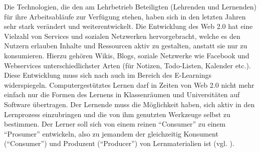 Die Technologien, die den am Lehrbetrieb Beteiligten (Lehrenden und Lernenden) für ihre Arbeitsabläufe zur Verfügung stehen, haben sich in den letzten Jahren sehr stark verändert und weiterentwickelt. Die Entwicklung des Web 2.0 hat eine Vielzahl von Services und sozialen Netzwerken hervorgebracht, welche es den Nutzern erlauben Inhalte und Ressourcen aktiv zu gestalten, anstatt sie nur zu konsumieren. Hierzu gehören Wikis, Blogs, soziale Netzwerke wie Facebook und Webservices unterschiedlichster Arten (für Notizen, Todo-Listen, Kalender etc.).
Diese Entwicklung muss sich nach \cite{Attwell2007} auch im Bereich des E-Learnings widerspiegeln. Computergestütztes Lernen darf in Zeiten von Web 2.0 nicht mehr einfach nur die Formen des Lernens in Klassenräumen und Universitäten auf Software übertragen. Der Lernende muss die Möglichkeit haben, sich aktiv in den Lernprozess einzubringen und die von ihm genutzten Werkzeuge selbst zu bestimmen. Der Lerner soll sich von einem reinen "`Consumer"' zu einem "`Prosumer"' entwickeln, also zu jemandem der gleichzeitig Konsument ("`Consumer"') und Produzent ("`Producer"') von Lernmaterialien ist (vgl. \cite{Schaffert2008a}).

